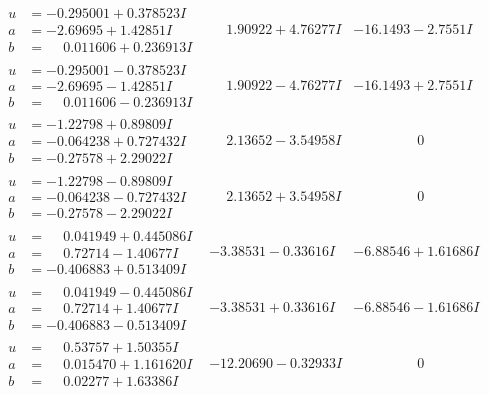 \documentclass[1p]{elsarticle_modified}
\theoremstyle{definition}
\begin{document}
$$\begin{array}{c|c|c}
\begin{aligned}
u &= -0.295001 + 0.378523 I \\
a &= -2.69695 + 1.42851 I \\
b &= \phantom{-}0.011606 + 0.236913 I\end{aligned}
 & \phantom{-}1.90922 + 4.76277 I & -16.1493 - 2.7551 I \\ \hline\begin{aligned}
u &= -0.295001 - 0.378523 I \\
a &= -2.69695 - 1.42851 I \\
b &= \phantom{-}0.011606 - 0.236913 I\end{aligned}
 & \phantom{-}1.90922 - 4.76277 I & -16.1493 + 2.7551 I \\ \hline\begin{aligned}
u &= -1.22798 + 0.89809 I \\
a &= -0.064238 + 0.727432 I \\
b &= -0.27578 + 2.29022 I\end{aligned}
 & \phantom{-}2.13652 - 3.54958 I & \phantom{-0.000000 } 0 \\ \hline\begin{aligned}
u &= -1.22798 - 0.89809 I \\
a &= -0.064238 - 0.727432 I \\
b &= -0.27578 - 2.29022 I\end{aligned}
 & \phantom{-}2.13652 + 3.54958 I & \phantom{-0.000000 } 0 \\ \hline\begin{aligned}
u &= \phantom{-}0.041949 + 0.445086 I \\
a &= \phantom{-}0.72714 - 1.40677 I \\
b &= -0.406883 + 0.513409 I\end{aligned}
 & -3.38531 - 0.33616 I & -6.88546 + 1.61686 I \\ \hline\begin{aligned}
u &= \phantom{-}0.041949 - 0.445086 I \\
a &= \phantom{-}0.72714 + 1.40677 I \\
b &= -0.406883 - 0.513409 I\end{aligned}
 & -3.38531 + 0.33616 I & -6.88546 - 1.61686 I \\ \hline\begin{aligned}
u &= \phantom{-}0.53757 + 1.50355 I \\
a &= \phantom{-}0.015470 + 1.161620 I \\
b &= \phantom{-}0.02277 + 1.63386 I\end{aligned}
 & -12.20690 - 0.32933 I & \phantom{-0.000000 } 0\\

\end{array}$$
\end{document}

